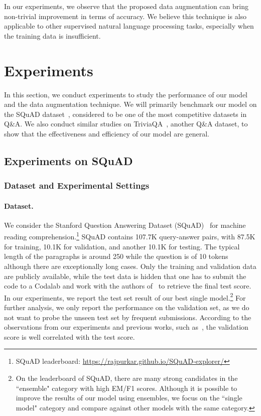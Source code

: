 \documentclass{article} \usepackage{iclr2018_conference,times}
\begin{document}
In our experiments, we observe that the proposed data augmentation can bring non-trivial improvement in terms of accuracy. We believe this technique is also applicable to other supervised natural language processing tasks, especially when the training data is insufficient.
 \section{Experiments}\label{sec:experiment}

In this section, we conduct experiments to study the performance of our model and the data augmentation technique. We will primarily benchmark our model on the SQuAD dataset~\citep{RajpurkarZLL16}, considered to be one of the most competitive datasets in Q\&A. We also conduct similar studies on  TriviaQA~\citep{JoshiCWZ17}, another Q\&A dataset, to show that the effectiveness and efficiency of our model are general.

\subsection{Experiments on SQuAD}
\subsubsection{Dataset and Experimental Settings}
\paragraph{Dataset.} We consider the Stanford Question Answering Dataset (SQuAD)~\citep{RajpurkarZLL16} for machine reading comprehension.\footnote{SQuAD leaderboard: \url{https://rajpurkar.github.io/SQuAD-explorer/}} 
SQuAD contains 107.7K query-answer pairs, with 87.5K for training, 10.1K for validation, and another 10.1K for testing. The typical length of the paragraphs is around 250 while the question is of 10 tokens although there are exceptionally long cases. Only the training and validation data are publicly available, while the test data is hidden that one has to submit the code to a Codalab and work with the authors of~\citep{RajpurkarZLL16} to retrieve the final test score. In our experiments, we report the test set result of our best single model.\footnote{On the leaderboard of SQuAD, there are many strong candidates in the ``ensemble" category with high EM/F1 scores. Although it is possible to improve the results of our model using ensembles, we focus on the ``single model" category and compare against other models with the same category.} For further analysis, we only report the performance on the validation set, as we do not want to probe the unseen test set by frequent submissions. 
According to the observations from our experiments and previous works, such as~\citep{SeoKFH16,XiongZS16,WangYWCZ17,ChenFWB17}, the validation score is well correlated with the test score. 
\end{document}
